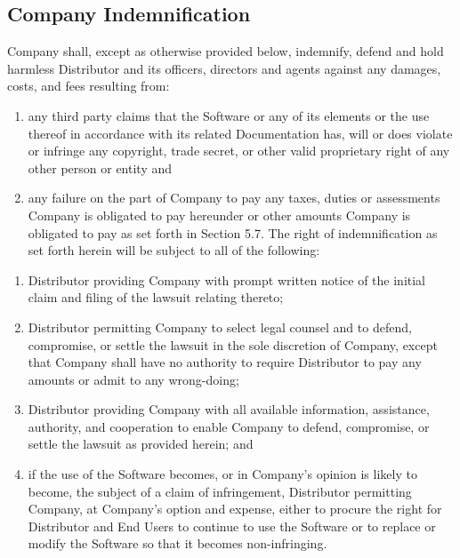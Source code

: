 \documentclass[letterpaper,10pt,english]{sphinxmanual}
\begin{document}
\subsection{Company Indemnification}
\label{\detokenize{indemnification:company-indemnification}}
Company shall, except as otherwise provided below, indemnify, defend and hold harmless Distributor and its officers, directors and agents against any damages, costs, and fees resulting from:
\begin{enumerate}
\item {} 
any third party claims that the Software or any of its elements or the use thereof in accordance with its related Documentation has, will or does violate or infringe any copyright, trade secret, or other valid  proprietary right of any other person or entity and

\item {} 
any failure on the part of Company to pay any taxes, duties or assessments Company is obligated to pay hereunder or other amounts Company is obligated to pay as set forth in Section 5.7. The right of indemnification as set forth herein will be subject to all of the following:

\end{enumerate}
\begin{enumerate}
\item {} 
Distributor providing Company with prompt written notice of the initial claim and filing of the lawsuit relating thereto;

\item {} 
Distributor permitting Company to select legal counsel and to defend, compromise, or settle the lawsuit in the sole discretion of Company, except that Company shall have no authority to require Distributor to pay any amounts or admit to any wrong-doing;

\item {} 
Distributor providing Company with all available information, assistance, authority, and cooperation to enable Company to defend, compromise, or settle the lawsuit as provided herein; and

\item {} 
if the use of the Software becomes, or in Company’s opinion is likely to become, the subject of a claim of infringement, Distributor permitting Company, at Company’s option and expense, either to procure the right for Distributor and End Users to continue to use the Software or to replace or modify the Software so that it becomes non-infringing.

\end{enumerate}
\end{document}
